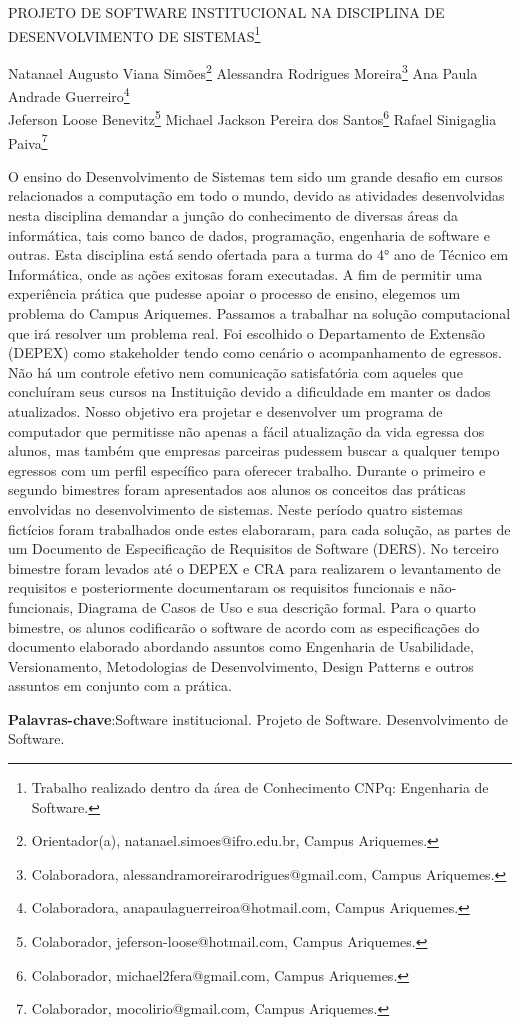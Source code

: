 \documentclass[article,12pt,onesidea,4paper,english,brazil]{abntex2}
\begin{document}
	
	
	\frenchspacing 
	
	\begin{center}
		\LARGE PROJETO DE SOFTWARE INSTITUCIONAL NA DISCIPLINA DE
		DESENVOLVIMENTO DE SISTEMAS\footnote{Trabalho realizado dentro da área de Conhecimento CNPq: Engenharia de Software.}
		
		\normalsize
	Natanael Augusto Viana Simões\footnote{Orientador(a), natanael.simoes@ifro.edu.br, Campus Ariquemes.} 
	Alessandra Rodrigues Moreira\footnote{Colaboradora, alessandramoreirarodrigues@gmail.com, Campus Ariquemes.} 
	Ana Paula Andrade Guerreiro\footnote{Colaboradora, anapaulaguerreiroa@hotmail.com, Campus Ariquemes.} \\
	Jeferson Loose Benevitz\footnote{Colaborador, jeferson-loose@hotmail.com, Campus Ariquemes.} 
    Michael Jackson Pereira dos Santos\footnote{Colaborador, michael2fera@gmail.com, Campus Ariquemes.} 
	Rafael Sinigaglia Paiva\footnote{Colaborador, mocolirio@gmail.com, Campus Ariquemes.}
	\end{center}
	
	\noindent O ensino do Desenvolvimento de Sistemas tem sido um grande desafio em cursos
	relacionados a computação em todo o mundo, devido as atividades desenvolvidas
	nesta disciplina demandar a junção do conhecimento de diversas áreas da
	informática, tais como banco de dados, programação, engenharia de software e
	outras. Esta disciplina está sendo ofertada para a turma do 4° ano de Técnico em
	Informática, onde as ações exitosas foram executadas. A fim de permitir uma
	experiência prática que pudesse apoiar o processo de ensino, elegemos um
	problema do Campus Ariquemes. Passamos a trabalhar na solução computacional
	que irá resolver um problema real. Foi escolhido o Departamento de Extensão
	(DEPEX) como stakeholder tendo como cenário o acompanhamento de egressos.
	Não há um controle efetivo nem comunicação satisfatória com aqueles que
	concluíram seus cursos na Instituição devido a dificuldade em manter os dados
	atualizados. Nosso objetivo era projetar e desenvolver um programa de computador
	que permitisse não apenas a fácil atualização da vida egressa dos alunos, mas
	também que empresas parceiras pudessem buscar a qualquer tempo egressos com
	um perfil específico para oferecer trabalho. Durante o primeiro e segundo bimestres
	foram apresentados aos alunos os conceitos das práticas envolvidas no
	desenvolvimento de sistemas. Neste período quatro sistemas fictícios foram
	trabalhados onde estes elaboraram, para cada solução, as partes de um Documento
	de Especificação de Requisitos de Software (DERS). No terceiro bimestre foram
	levados até o DEPEX e CRA para realizarem o levantamento de requisitos e
	posteriormente documentaram os requisitos funcionais e não-funcionais, Diagrama
	de Casos de Uso e sua descrição formal. Para o quarto bimestre, os alunos
	codificarão o software de acordo com as especificações do documento elaborado
	abordando assuntos como Engenharia de Usabilidade, Versionamento,
	Metodologias de Desenvolvimento, Design Patterns e outros assuntos em conjunto
	com a prática.
	
	\vspace{\onelineskip}
	
	\noindent
	\textbf{Palavras-chave}:Software institucional. Projeto de Software. Desenvolvimento de Software.
	
\end{document}
